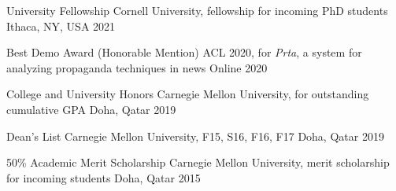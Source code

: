
\begin{cvhonors}

  \cvhonor
    {University Fellowship}
    {Cornell University, fellowship for incoming PhD students}
    {Ithaca, NY, USA}
    {2021}

  \cvhonor
    {Best Demo Award (Honorable Mention)}
    {ACL 2020, for \textit{Prta}, a system for analyzing propaganda techniques in news}
    {Online}
    {2020}

  \cvhonor
    {College and University Honors}
    {Carnegie Mellon University, for outstanding cumulative GPA}
    {Doha, Qatar}
    {2019}

  \cvhonor
    {Dean's List}
    {Carnegie Mellon University, F15, S16, F16, F17}
    {Doha, Qatar}
    {2019}

  \cvhonor
    {50\% Academic Merit Scholarship}
    {Carnegie Mellon University, merit scholarship for incoming students}
    {Doha, Qatar}
    {2015}

\end{cvhonors}

